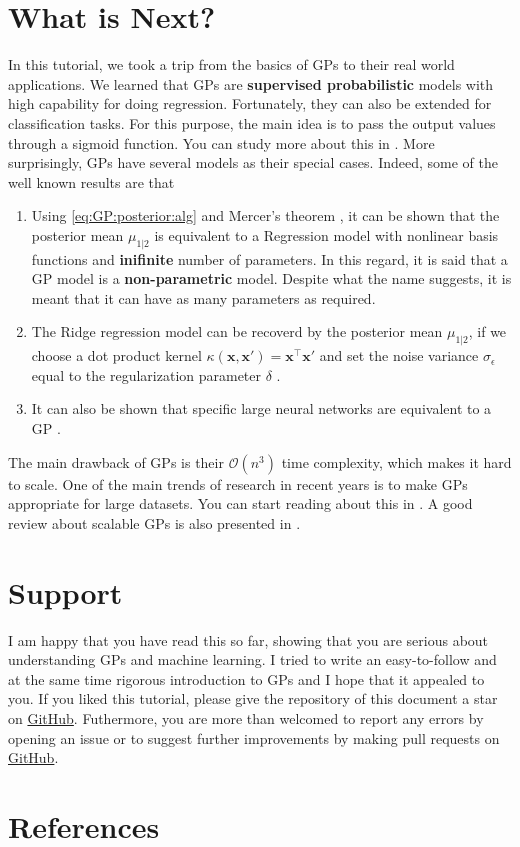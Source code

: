 \documentclass[10pt]{article}
\theoremstyle{definition}
\theoremstyle{definition}
\theoremstyle{remark}
\begin{document}
\section{What is Next?}
In this tutorial, we took a trip from the basics of GPs to their real world applications. We learned that GPs are \textbf{supervised probabilistic} models with high capability for doing regression. Fortunately, they can also be extended for classification tasks. For this purpose, the main idea is to pass the output values  through a sigmoid function. You can study more about this in \cite[Chapter 3]{Rasmussen2006}. More surprisingly, GPs have several models as their special cases. Indeed, some of the well known results are that
\begin{enumerate}[noitemsep]
\item Using \cref{eq:GP:posterior:alg} and Mercer's theorem \cite[Section 4.3]{Rasmussen2006}, it can be shown that the posterior mean $\mu_{1|2}$ is equivalent to a Regression model with nonlinear basis functions and \textbf{inifinite} number of parameters. In this regard, it is said that a GP model is a \textbf{non-parametric} model. Despite what the name suggests, it is meant that it can have as many parameters as required.
\item The Ridge regression model can be recoverd by the posterior mean $\mu_{1|2}$, if we choose a dot product kernel $\kappa(\mathbf{x},\mathbf{x}')=\mathbf{x}^{\top}\mathbf{x}'$ and set the noise variance $\sigma_{\epsilon}$ equal to the regularization parameter $\delta$ \cite[Lecture 9]{Freitas2013}.
\item It can also be shown that specific large neural networks are equivalent to a GP \cite{MacKay1998}.
\end{enumerate}
The main drawback of GPs is their $\mathcal{O}(n^3)$ time complexity, which makes it hard to scale. One of the main trends of research in recent years is to make GPs appropriate for large datasets. You can start reading about this in \cite[Chapter 8]{Rasmussen2006}. A good review about scalable GPs is also presented in \cite{Liu2020}.


\section{Support}
I am happy that you have read this so far, showing that you are serious about understanding GPs and machine learning. I tried to write an easy-to-follow and at the same time rigorous introduction to GPs and I hope that it appealed to you. If you liked this tutorial, please give the repository of this document a star on \href{https://github.com/Hosein-Rahnama/Gaussian-Processes.git}{GitHub}. Futhermore, you are more than welcomed to report any errors by opening an issue or to suggest further improvements by making pull requests on \href{https://github.com/Hosein-Rahnama/Gaussian-Processes.git}{GitHub}.


\newpage
\section{References}
\printbibliography[heading=none]
\end{document}
